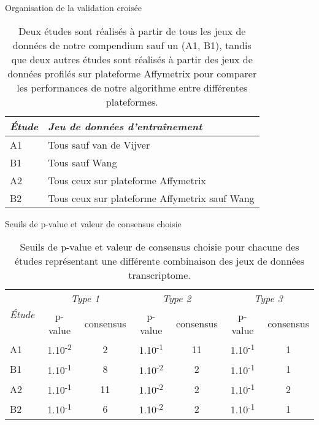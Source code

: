 		\begin{table}
			\begin{center}
				\caption{Organisation de la validation croisée}
				\begin{tabular}{ll}
					\toprule
					\emph{Étude} & \emph{Jeu de données d'entraînement} \\
					\midrule
					A1 &  Tous sauf van de Vijver                       \\
					B1 &  Tous sauf Wang                                \\
					A2 &  Tous ceux sur plateforme Affymetrix           \\
					B2 &  Tous ceux sur plateforme Affymetrix sauf Wang \\
					\bottomrule
				\end{tabular}
				\label{tab:Res1Train}
				\vspace{5ex}
				\caption*{Deux études sont réalisés à partir de tous les jeux de données de notre compendium sauf un (A1, B1), tandis que deux autres études sont réalisés à partir des jeux de données profilés sur plateforme Affymetrix pour comparer les performances de notre algorithme entre différentes plateformes.}
			\end{center}
		\end{table}

		\begin{table}
			\begin{center}
				\caption{Seuils de p-value et valeur de consensus choisie}
				\begin{tabular}{lcccccc}
					\toprule
					\multirow{2}{2cm}{\emph{Étude}} & \multicolumn{2}{c}{\centering\emph{Type 1}} & \multicolumn{2}{c}{\centering\emph{Type 2}} & \multicolumn{2}{c}{\centering\emph{Type 3}} \\
					\cmidrule(r){2-3}\cmidrule(r){4-5}\cmidrule(r){6-7}
					& p-value & consensus & p-value & consensus & p-value & consensus \\
					\midrule
					A1	&	1.10\textsuperscript{-2}	&	2	&	1.10\textsuperscript{-1}	&	11	&	1.10\textsuperscript{-1}	&	1	\\
					B1	&	1.10\textsuperscript{-1}	&	8	&	1.10\textsuperscript{-2}	&	2	&	1.10\textsuperscript{-1}	&	1	\\
					A2	&	1.10\textsuperscript{-1}	&	11	&	1.10\textsuperscript{-2}	&	2	&	1.10\textsuperscript{-1}	&	2	\\
					B2	&	1.10\textsuperscript{-1}	&	6	&	1.10\textsuperscript{-2}	&	2	&	1.10\textsuperscript{-1}	&	1	\\
					\bottomrule
				\end{tabular}
				\label{tab:Res1Threshold}
				\vspace{5ex}
				\caption*{Seuils de p-value et valeur de consensus choisie pour chacune des études représentant une différente combinaison des jeux de données transcriptome.}
			\end{center}
		\end{table}


